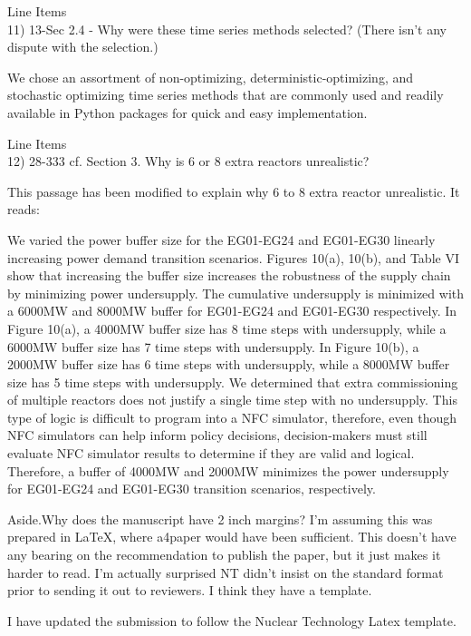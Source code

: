 \documentclass[answers,11pt]{exam}
\begin{document}
\begin{questions}
\question Line Items \\
11) 13-Sec 2.4 - Why were these time series methods selected? (There isn’t any dispute with the selection.)

\begin{solution}
We chose an assortment of non-optimizing, deterministic-optimizing, and stochastic 
optimizing time series methods that are commonly used and readily available in Python 
packages for quick and easy implementation. 
\end{solution}

\question Line Items \\
12) 28-333 cf. Section 3. Why is 6 or 8 extra reactors unrealistic?

\begin{solution}
This passage has been modified to explain why 6 to 8 extra 
reactor unrealistic. It reads: 

We varied the power buffer size for the EG01-EG24 and EG01-EG30 
linearly increasing power demand transition scenarios. 
Figures 10(a), 10(b), 
and Table VI 
show that increasing the buffer size increases the robustness 
of the supply chain by minimizing power undersupply. 
The cumulative undersupply is minimized with a 6000MW and 8000MW 
buffer for EG01-EG24 and EG01-EG30 respectively.
In Figure 10(a), a 4000MW buffer size has 
8 time steps with undersupply, while a 6000MW buffer size has 
7 time steps with undersupply. 
In Figure 10(b), a 2000MW buffer size has 
6 time steps with undersupply, while a 8000MW buffer size has 
5 time steps with undersupply. 
We determined that extra commissioning of multiple reactors does not 
justify a single time step with no undersupply. 
This type of logic is difficult to program into a NFC simulator, 
therefore, even though NFC simulators can help inform policy decisions, 
decision-makers must still evaluate NFC simulator results to determine if 
they are valid and logical. 
Therefore, a buffer of 4000MW and 2000MW minimizes 
the power undersupply for EG01-EG24 and EG01-EG30 transition 
scenarios, respectively.
\end{solution}

\question 
Aside.Why does the manuscript have 2 inch margins? I’m assuming this was prepared in LaTeX, where
a4paper would have been sufficient. This doesn’t have any bearing on the recommendation to publish
the paper, but it just makes it harder to read. I’m actually surprised NT didn’t insist on the standard
format prior to sending it out to reviewers. I think they have a template.

\begin{solution}
I have updated the submission to follow the Nuclear Technology Latex template. 
\end{solution}

\end{questions}
\end{document}
